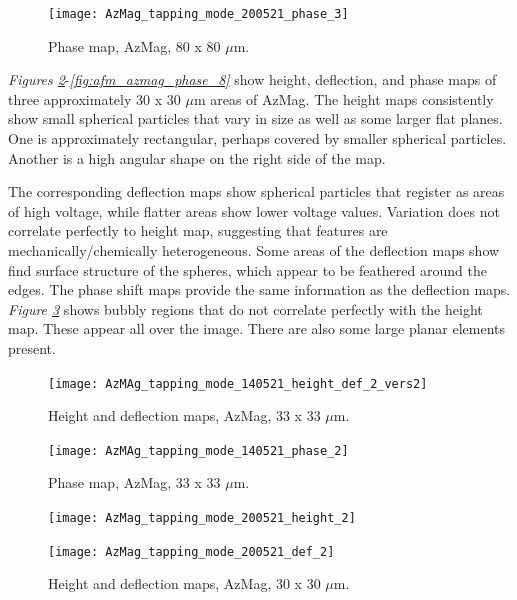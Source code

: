 \begin{figure}[H]
\centering
  \texttt{[image: AzMag\_tapping\_mode\_200521\_phase\_3]}
\caption[Phase map, AzMag]{Phase map, AzMag, 80 x 80 $\mu$m.}
\label{fig:afm_azmag_phase_5}
\end{figure}

\textit{Figures \ref{fig:afm_azmag_height_def_6}}-\textit{\ref{fig:afm_azmag_phase_8}} show height, deflection, and phase maps of three approximately 30 x 30 $\mu$m areas of AzMag. The height maps consistently show small spherical particles that vary in size as well as some larger flat planes. One is approximately rectangular, perhaps covered by smaller spherical particles. Another is a high angular shape on the right side of the map.

The corresponding deflection maps show spherical particles that register as areas of high voltage, while flatter areas show lower voltage values. Variation does not correlate perfectly to height map, suggesting that features are mechanically/chemically heterogeneous. Some areas of the deflection maps show find surface structure of the spheres, which appear to be feathered around the edges. The phase shift maps provide the same information as the deflection maps. \textit{Figure \ref{fig:afm_azmag_phase_6}} shows bubbly regions that do not correlate perfectly with the height map. These appear all over the image. There are also some large planar elements present.

\begin{figure}[H]
\centering
  \texttt{[image: AzMAg\_tapping\_mode\_140521\_height\_def\_2\_vers2]}
\caption[Height and deflection maps, AzMag]{Height and deflection maps, AzMag, 33 x 33 $\mu$m.}
\label{fig:afm_azmag_height_def_6}
\end{figure}

\begin{figure}[H]
\centering
  \texttt{[image: AzMAg\_tapping\_mode\_140521\_phase\_2]}
\caption[Phase map, AzMag]{Phase map, AzMag, 33 x 33 $\mu$m.}
\label{fig:afm_azmag_phase_6}
\end{figure}


\begin{figure}[H]
\centering
\begin{minipage}{.45\textwidth}
  \centering
  \texttt{[image: AzMag\_tapping\_mode\_200521\_height\_2]}
\end{minipage}
\begin{minipage}{.45\textwidth}
  \centering
  \texttt{[image: AzMag\_tapping\_mode\_200521\_def\_2]}
\end{minipage}
\caption[Height and deflection maps, AzMag]{Height and deflection maps, AzMag, 30 x 30 $\mu$m.}
\label{fig:afm_azmag_height_def_7}
\end{figure}

